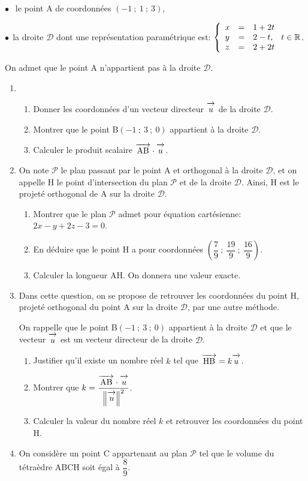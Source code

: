 \documentclass[11pt,a4paper,french]{article}
\newcommand{\R}{\mathbb{R}}
\newcommand{\vect}[1]{\overrightarrow{\,\mathstrut#1\,}}
\begin{document}
$\bullet~~$ le point A de coordonnées $(-1~;~1~;~3)$,

$\bullet~~$la droite $\mathcal{D}$ dont une représentation paramétrique est: $\left\{\begin{array}{l c l}
x&=&1+2t\\y &=& 2 - t,\\z&=& 2+2t
\end{array}\right.  t \in \R$.

On admet que le point A n'appartient pas à la droite $\mathcal{D}$.

\medskip

\begin{enumerate}
\item 
	\begin{enumerate}
		\item Donner les coordonnées d'un vecteur directeur $\vect{u}$ de la droite $\mathcal{D}$.
		

		\item Montrer que le point B$(-1~;~3~;~0)$ appartient à la droite $\mathcal{D}$.
		\item Calculer le produit scalaire $\vect{\text{AB}} \cdot \vect{u}$.
	\end{enumerate}	
\item On note $\mathcal{P}$ le plan passant par le point A et orthogonal à la droite $\mathcal{D}$, et on appelle H le point d'intersection du plan $\mathcal{P}$ et de la droite $\mathcal{D}$. Ainsi, H est le projeté orthogonal de A sur la droite $\mathcal{D}$.
	\begin{enumerate}
		\item Montrer que le plan $\mathcal{P}$ admet pour équation cartésienne: $2x - y + 2z - 3 = 0$.
		\item En déduire que le point H a pour coordonnées $\left(\dfrac79~;~\dfrac{19}{9}~;~\dfrac{16}{9}\right)$.
		\item Calculer la longueur AH. On donnera une valeur exacte.
	\end{enumerate}	
\item Dans cette question, on se propose de retrouver les coordonnées du point H, projeté orthogonal du point A sur la droite $\mathcal{D}$, par une autre méthode.

On rappelle que le point B$(-1~;~3~;~0)$ appartient à la droite $\mathcal{D}$ et que le vecteur $\vect{u}$ est un vecteur directeur de la droite $\mathcal{D}$.
	\begin{enumerate}
		\item Justifier qu'il existe un nombre réel $k$ tel que $\vect{\text{HB}} = k\vect{u}$.
		\item Montrer que $k = \dfrac{\vect{\text{AB}} \cdot \vect{u}}{\left\|\vect{u}\right\|^2}$.
		\item Calculer la valeur du nombre réel $k$ et retrouver les coordonnées du point H.
	\end{enumerate}
\item On considère un point C appartenant au plan $\mathcal{P}$ tel que le volume du tétraèdre ABCH soit égal à $\dfrac89$.


\end{enumerate}
\end{document}
